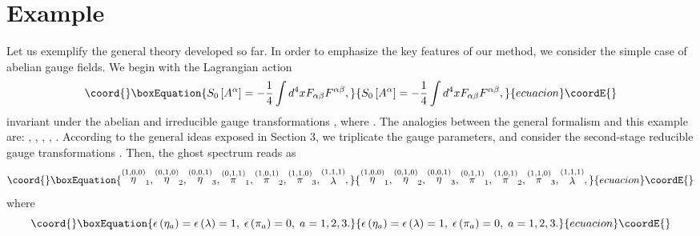 \documentclass[a4paper,12pt]{article}
\begin{document}
\section{Example}

Let us exemplify the general theory developed so far. In order to emphasize
the key features of our method, we consider the simple case of abelian gauge
fields. We begin with the Lagrangian action 
\begin{equation}\coord{}\boxEquation{
S_{0}\left[ A^{\alpha }\right] =-\frac{1}{4}\int d^{4}xF_{\alpha \beta
}F^{\alpha \beta },  \label{sp3.e1}
}{
S_{0}\left[ A^{\alpha }\right] =-\frac{1}{4}\int d^{4}xF_{\alpha \beta
}F^{\alpha \beta },  }{ecuacion}\coordE{}\end{equation}
invariant under the abelian and irreducible gauge transformations \coordHE{}, where \coordHE{}. The analogies between the general formalism and this example are: \coordHE{}, \coordHE{}, \coordHE{}, \coordHE{}, \coordHE{}. According to the general ideas exposed in Section 3, we
triplicate the gauge parameters, and consider the second-stage reducible
gauge transformations \coordHE{}. Then, the ghost spectrum reads as 
\begin{equation}\coord{}\boxEquation{
\stackrel{(1,0,0)}{\eta }_{1},\stackrel{(0,1,0)}{\eta }_{2},\stackrel{(0,0,1)
}{\eta }_{3},\stackrel{(0,1,1)}{\pi }_{1},\stackrel{(1,0,1)}{\pi }_{2},
\stackrel{(1,1,0)}{\pi }_{3},\stackrel{(1,1,1)}{\lambda },  \label{sp3.e4}
}{
\stackrel{(1,0,0)}{\eta }_{1},\stackrel{(0,1,0)}{\eta }_{2},\stackrel{(0,0,1)
}{\eta }_{3},\stackrel{(0,1,1)}{\pi }_{1},\stackrel{(1,0,1)}{\pi }_{2},
\stackrel{(1,1,0)}{\pi }_{3},\stackrel{(1,1,1)}{\lambda },  }{ecuacion}\coordE{}\end{equation}
where 
\begin{equation}\coord{}\boxEquation{
\epsilon \left( \eta _{a}\right) =\epsilon \left( \lambda \right)
=1,\;\epsilon \left( \pi _{a}\right) =0,\;a=1,2,3.  \label{sp3.e5}
}{
\epsilon \left( \eta _{a}\right) =\epsilon \left( \lambda \right)
=1,\;\epsilon \left( \pi _{a}\right) =0,\;a=1,2,3.  }{ecuacion}\coordE{}\end{equation}
\end{document}
